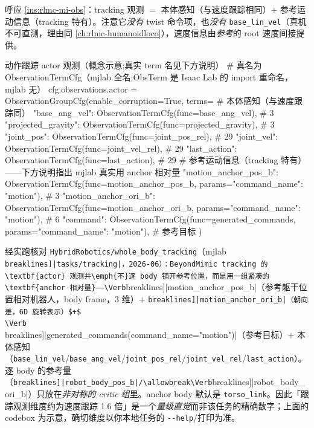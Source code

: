 呼应 \cref{ins:rlmc-mi-obs}：tracking 观测 $=$ 本体感知（与速度跟踪相同）$+$ 参考运动信息（tracking 特有）。注意它\emph{没有} twist 命令项，也\emph{没有} \verb|base_lin_vel|（真机不可直测，理由同 \cref{ch:rlmc-humanoidloco}），速度信息由\emph{参考}的 root 速度间接提供。

\begin{codebox}[Python]{动作跟踪 actor 观测（概念示意;真实 term 名见下方说明）}
# 真名为 ObservationTermCfg（mjlab 全名;ObsTerm 是 Isaac Lab 的 import 重命名，mjlab 无）
cfg.observations.actor = ObservationGroupCfg(enable_corruption=True, terms={
    # 本体感知（与速度跟踪同）
    "base_ang_vel":      ObservationTermCfg(func=base_ang_vel),       # 3
    "projected_gravity": ObservationTermCfg(func=projected_gravity),  # 3
    "joint_pos":         ObservationTermCfg(func=joint_pos_rel),      # 29
    "joint_vel":         ObservationTermCfg(func=joint_vel_rel),      # 29
    "last_action":       ObservationTermCfg(func=last_action),        # 29
    # 参考运动信息（tracking 特有）——下方说明指出 mjlab 真实用 anchor 相对量
    "motion_anchor_pos_b": ObservationTermCfg(func=motion_anchor_pos_b,
                                              params={"command_name": "motion"}),  # 3
    "motion_anchor_ori_b": ObservationTermCfg(func=motion_anchor_ori_b,
                                              params={"command_name": "motion"}),  # 6
    "command":             ObservationTermCfg(func=generated_commands,
                                              params={"command_name": "motion"}),  # 参考目标
})
\end{codebox}

\begin{note}
经实跑核对 \texttt{HybridRobotics/\allowbreak whole\_body\_tracking}（mjlab \Verb[breaklines]|tasks/tracking|，2026-06）：BeyondMimic tracking 的 \textbf{actor} 观测并\emph{不}逐 body 铺开参考位置，而是用一组紧凑的 \textbf{anchor 相对量}——\Verb[breaklines]|motion_anchor_pos_b|（参考躯干位置相对机器人，body frame，3 维）$+$ \Verb[breaklines]|motion_anchor_ori_b|（朝向差，6D 旋转表示）$+$ \Verb[breaklines]|generated_commands(command_name="motion")|（参考目标）$+$ 本体感知（\verb|base_lin_vel|/\allowbreak\verb|base_ang_vel|/\allowbreak\verb|joint_pos_rel|/\allowbreak\verb|joint_vel_rel|/\allowbreak\verb|last_action|）。逐 body 的参考量（\Verb[breaklines]|robot_body_pos_b|/\allowbreak\Verb[breaklines]|robot_body_ori_b|）只放在\emph{非对称的 critic 组}里。anchor body 默认是 \verb|torso_link|。因此「跟踪观测维度约为速度跟踪 1.6 倍」是一个\emph{量级直觉}而非该任务的精确数字；上面的 codebox 为示意，确切维度以你本地任务的 \verb|--help|/打印为准。
\end{note}

